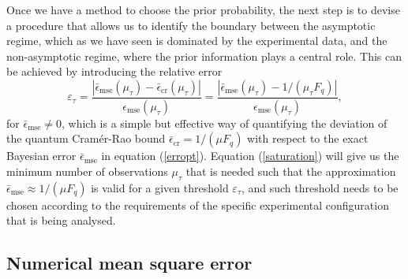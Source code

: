 Once we have a method to choose the prior probability, the next step is to devise a procedure that allows us to identify the boundary between the asymptotic regime, which as we have seen is dominated by the experimental data, and the non-asymptotic regime, where the prior information plays a central role. This can be achieved by introducing the relative error 
\begin{equation}
\varepsilon_\tau = \frac{|\bar{\epsilon}_{\mathrm{mse}}(\mu_{\tau}) - \bar{\epsilon}_{\mathrm{cr}}(\mu_{\tau})|}{\epsilon_{\mathrm{mse}}(\mu_{\tau})} = \frac{|\bar{\epsilon}_{\mathrm{mse}}(\mu_{\tau}) - 1/(\mu_{\tau} F_q)|}{\epsilon_{\mathrm{mse}}(\mu_{\tau})},
\label{saturation}
\end{equation}
for $\bar{\epsilon}_{\mathrm{mse}} \neq 0$, which is a simple but effective way of quantifying the deviation of the quantum Cram\'{e}r-Rao bound $\bar{\epsilon}_{\mathrm{cr}} = 1/(\mu F_q)$ with respect to the exact Bayesian error $\bar{\epsilon}_{\mathrm{mse}}$ in equation (\ref{erropt}). Equation (\ref{saturation}) will give us the minimum number of observations $\mu_{\tau}$ that is needed such that the approximation $\bar{\epsilon}_{\mathrm{mse}} \approx 1/(\mu F_q)$ is valid for a given threshold $\varepsilon_{\tau}$, and such threshold needs to be chosen according to the requirements of the specific experimental configuration that is being analysed.

\subsection{Numerical mean square error}
\label{subsec:numalgorithm}

